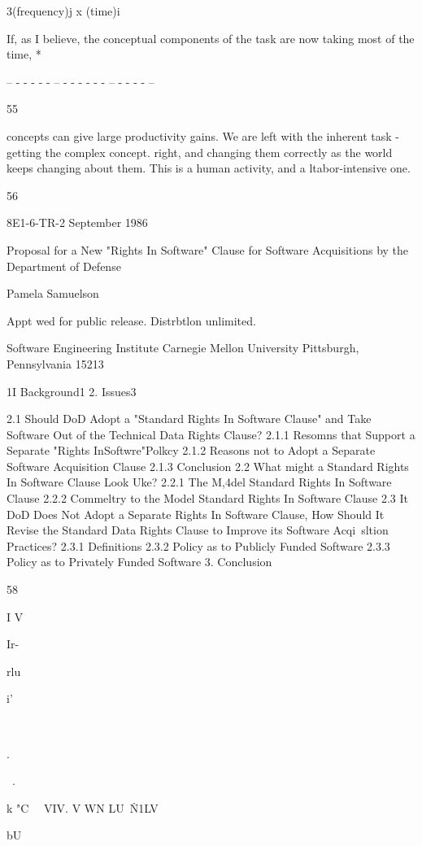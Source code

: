 \documentclass[12pt]{article}
\begin{document}
3(frequency)j x (time)i

If, as I believe, the conceptual components of the task are now taking most of the time,
*

-- - - - - - -- - - - - - - -- - - - - --

55

concepts can give large productivity gains.
We are left with the inherent task - getting the complex concept. right, and changing
them correctly as the world keeps changing about them. This is a human activity, and a
ltabor-intensive one.

56

8E1-6-TR-2
September 1986

Proposal for a New "Rights In Software" Clause
for Software Acquisitions by the Department of
Defense

Pamela Samuelson

Appt wed for public release.
Distrbtlon unlimited.

Software Engineering Institute
Carnegie Mellon University
Pittsburgh, Pennsylvania 15213


1I Background1
2. Issues3

2.1 Should DoD Adopt a "Standard Rights In Software Clause"
and Take Software Out of the Technical Data Rights Clause?
2.1.1 Resomns that Support a Separate "Rights InSoftwre"Polkcy
2.1.2 Reasons not to Adopt a Separate Software Acquisition Clause
2.1.3 Conclusion
2.2 What might a Standard Rights In Software Clause Look Uke?
2.2.1 The M,4del Standard Rights In Software Clause
2.2.2 Commeltry to the Model Standard Rights In Software Clause
2.3 It DoD Does Not Adopt a Separate Rights In Software Clause,
How Should It Revise the Standard Data Rights Clause to Improve
its Software Acqi~sltion Practices?
2.3.1 Definitions
2.3.2 Policy as to Publicly Funded Software
2.3.3 Policy as to Privately Funded Software
3. Conclusion

58

I V

Ir-

rlu

i'

~

.

~.~~

k "C~~
VIV. V WN LU~\.N1LV

bU%
\end{document}
